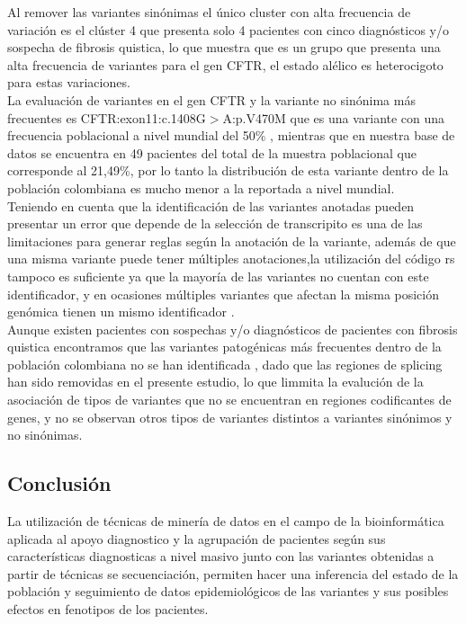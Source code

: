 Al remover las variantes sinónimas el único cluster con alta frecuencia de variación es el clúster 4 que presenta solo 4 pacientes con cinco diagnósticos y/o sospecha de fibrosis quistica, lo que muestra que es un grupo que presenta una alta frecuencia de variantes para el gen CFTR, el estado alélico es heterocigoto para estas variaciones.\\

La evaluación de variantes en el gen CFTR y la variante no sinónima más frecuentes es CFTR:exon11:c.1408G$>$A:p.V470M que es una variante con una frecuencia poblacional a nivel mundial del 50\% \cite{Zerbino2018}, mientras que en  nuestra base de datos se encuentra en 49 pacientes del total de la muestra poblacional que corresponde al 21,49\%, por lo tanto la distribución de esta variante dentro de la población colombiana es mucho menor a la reportada a nivel mundial.\\

Teniendo en cuenta que la identificación de las variantes anotadas pueden presentar un error que depende de la selección de transcripito es una de las limitaciones para generar reglas según la anotación de la variante, además de que una misma variante puede tener múltiples anotaciones,la utilización del código rs tampoco es suficiente ya que la mayoría de las variantes no cuentan con este identificador, y en ocasiones múltiples variantes que afectan la misma posición genómica tienen un mismo identificador \cite{Liu2016,McCarthy2014}. \\  

Aunque existen pacientes con sospechas y/o diagnósticos de pacientes con fibrosis quistica encontramos que las variantes patogénicas más frecuentes dentro de la población colombiana no se han identificada \cite{Vasquez2010}, dado que las regiones de splicing han sido removidas en el presente estudio, lo que limmita la evalución de la asociación de tipos de variantes que no se encuentran en regiones codificantes de genes, y no se observan otros tipos de variantes distintos a variantes sinónimos y no sinónimas. 

\subsection{Conclusión}

La utilización de técnicas de minería de datos en el campo de la bioinformática aplicada al apoyo diagnostico y  la agrupación de pacientes según sus características diagnosticas a nivel masivo junto con las variantes obtenidas a partir de técnicas se secuenciación, permiten hacer una inferencia del estado de la población y seguimiento de datos epidemiológicos de las variantes y sus posibles efectos en fenotipos de los pacientes.

